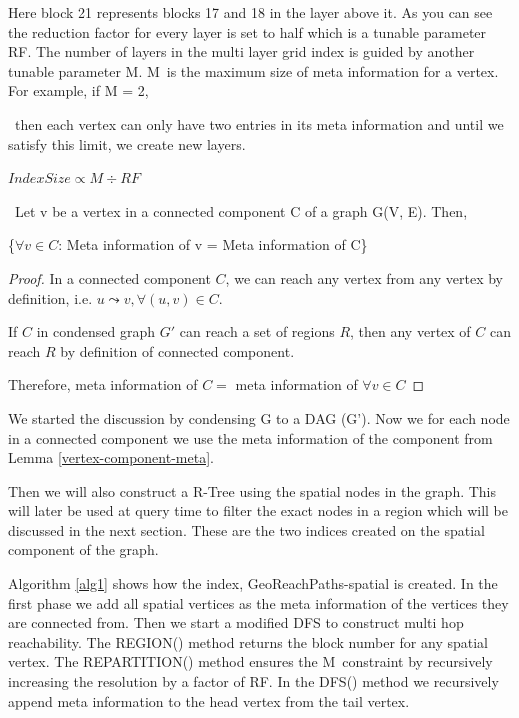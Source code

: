 {Here block 21 represents blocks 17 and 18 in the layer above it. As you can see the reduction factor for every layer is set to half which is a tunable parameter }{RF}{. The number of layers in the multi layer grid index is guided by another tunable parameter }{M}{. }{M}{~is the maximum size of meta information for a vertex. For example, if }{M = 2,}{~then each vertex can only have two entries in its meta information and until we satisfy this limit, we create new layers.

\begin{center}
$Index Size \propto M \div RF$
\end{center}
\vspace{2mm}

\begin{lemma}
\label{vertex-component-meta}
{~Let v be a vertex in a connected component C of a graph G(V, E). Then,}

{\{$\forall v \in C$: Meta information of v = Meta information of C\}}\newline
\end{lemma}

\begin{proof}
In a connected component $C$, we can reach any vertex from any vertex by definition, i.e. $u \leadsto v, \forall (u, v) \in C$. 

If $C$ in condensed graph $G'$ can reach a set of regions $R$, then any vertex of $C$ can reach $R$ by definition of connected component.

Therefore, meta information of $C =$ meta information of $\forall v \in C$
\end{proof}

{We started the discussion by condensing G to a DAG (G'). Now we for
each node in a connected component we use the meta information of the
component from Lemma \ref{vertex-component-meta}.}

Then we will also construct a R-Tree using the spatial nodes in the graph. This will later be used at query time to filter the exact nodes in a region which will be discussed in the next section. These are the two indices created on the spatial component of the graph.

{Algorithm \ref{alg1} shows how the index, GeoReachPaths-spatial is created. In the first phase we add all spatial vertices as the meta information of the vertices they are connected from. Then we start a modified DFS to construct multi hop reachability. The REGION() method returns the block number for any spatial vertex. The REPARTITION() method ensures the }{M}{~constraint by recursively increasing the resolution by a factor of }{RF}{. In the DFS() method we recursively append meta information to the head vertex from the tail vertex.}

}
